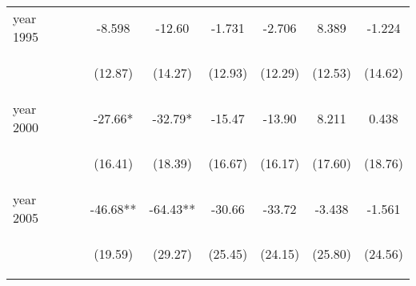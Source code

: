 \begin{landscape}
\begin{subtables}
\begin{table}[htpb!]
\begin{center}
\begin{tabular}{lcccccccc}
year 1995&&&-8.598&-12.60&-1.731&-2.706&8.389&-1.224\\
&&&\begin{footnotesize}(12.87)\end{footnotesize}&\begin{footnotesize}(14.27)\end{footnotesize}&\begin{footnotesize}(12.93)\end{footnotesize}&\begin{footnotesize}(12.29)\end{footnotesize}&\begin{footnotesize}(12.53)\end{footnotesize}&\begin{footnotesize}(14.62)\end{footnotesize}\\
year 2000&&&-27.66*&-32.79*&-15.47&-13.90&8.211&0.438\\
&&&\begin{footnotesize}(16.41)\end{footnotesize}&\begin{footnotesize}(18.39)\end{footnotesize}&\begin{footnotesize}(16.67)\end{footnotesize}&\begin{footnotesize}(16.17)\end{footnotesize}&\begin{footnotesize}(17.60)\end{footnotesize}&\begin{footnotesize}(18.76)\end{footnotesize}\\
year 2005&&&-46.68**&-64.43**&-30.66&-33.72&-3.438&-1.561\\
&&&\begin{footnotesize}(19.59)\end{footnotesize}&\begin{footnotesize}(29.27)\end{footnotesize}&\begin{footnotesize}(25.45)\end{footnotesize}&\begin{footnotesize}(24.15)\end{footnotesize}&\begin{footnotesize}(25.80)\end{footnotesize}&\begin{footnotesize}(24.56)\end{footnotesize}\\

\end{tabular}
\end{center}
\end{table}
\end{subtables}
\end{landscape}
